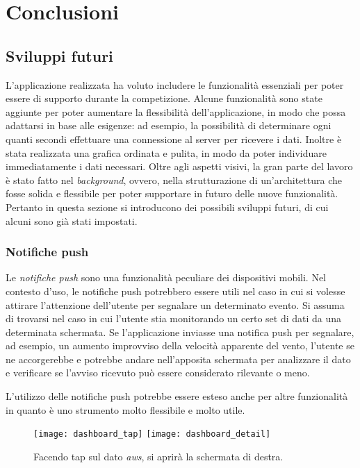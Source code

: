 \chapter{Conclusioni}

\section{Sviluppi futuri}
L'applicazione realizzata ha voluto includere le funzionalità essenziali per poter essere di supporto durante la competizione. Alcune funzionalità sono state aggiunte per poter aumentare la flessibilità dell'applicazione, in modo che possa adattarsi in base alle esigenze: ad esempio, la possibilità di determinare ogni quanti secondi effettuare una connessione al server per ricevere i dati. Inoltre è stata realizzata una grafica ordinata e pulita, in modo da poter individuare immediatamente i dati necessari. Oltre agli aspetti visivi, la gran parte del lavoro è stato fatto nel \textit{background}, ovvero, nella strutturazione di un'architettura che fosse solida e flessibile per poter supportare in futuro delle nuove funzionalità. Pertanto in questa sezione si introducono dei possibili sviluppi futuri, di cui alcuni sono già stati impostati.

\subsection{Notifiche push}
Le \textit{notifiche push} sono una funzionalità peculiare dei dispositivi mobili. Nel contesto d'uso, le notifiche push potrebbero essere utili nel caso in cui si volesse attirare l'attenzione dell'utente per segnalare un determinato evento. Si assuma di trovarsi nel caso in cui l'utente stia monitorando un certo set di dati da una determinata schermata. Se l'applicazione inviasse una notifica push per segnalare, ad esempio, un aumento improvviso della velocità apparente del vento, l'utente se ne accorgerebbe e potrebbe andare nell'apposita schermata per analizzare il dato e verificare se l'avviso ricevuto può essere considerato rilevante o meno.

L'utilizzo delle notifiche push potrebbe essere esteso anche per altre funzionalità in quanto è uno strumento molto flessibile e molto utile.

\begin{figure}[htp]
	\centering
	\texttt{[image: dashboard\_tap]}
	\texttt{[image: dashboard\_detail]}
	\caption[Sviluppi futuri - Dashboard]{Facendo tap sul dato \textit{aws}, si aprirà la schermata di destra.}\label{xyz}
\end{figure}

